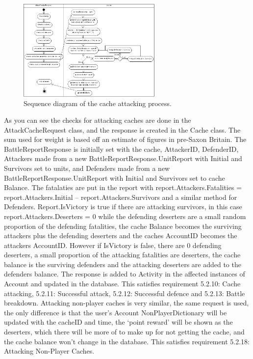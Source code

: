 \begin{figure}
    \centering
    \includegraphics[width=0.63\textwidth]{images/activity/server_attackCache}
    \caption{Sequence diagram of the cache attacking process.}
\end{figure}

As you can see the checks for attacking caches are done in the AttackCacheRequest class, and the response is created in the Cache class. The sum used for weight is based off an estimate of figures in pre-Saxon Britain. The BattleReportResponse is initially set with the cache, AttackerID, DefenderID, Attackers made from a new BattleReportResponse.UnitReport with Initial and Survivors set to units, and Defenders made from a new BattleReportResponse.UnitReport with Initial and Survivors set to cache Balance. The fatalaties are put in the report with report.Attackers.Fatalities = report.Attackers.Initial – report.Attackers.Survivors and a similar method for Defenders. Report.IsVictory is true if there are attacking survivors, in this case report.Attackers.Deserters = 0 while the defending deserters are a small random proportion of the defending fatalities, the cache Balance becomes the surviving attackers plus the defending deserters and the caches AccountID becomes the attackers AccountID. However if IsVictory is false, there are 0 defending deserters, a small proportion of the attacking fatalities are deserters, the cache balance is the surviving defenders and the attacking deserters are added to the defenders balance. The response is added to Activity in the affected instances of Account and updated in the database. This satisfies requirement 5.2.10: Cache attacking, 5.2.11: Successful attack, 5.2.12: Successful defence and 5.2.13: Battle breakdown. Attacking non-player caches is very similar, the same request is used, the only difference is that the user's Account NonPlayerDictionary will be updated with the cacheID and time, the `point reward' will be shown as the deserters, which there will be more of to make up for not getting the cache, and the cache balance won't change in the database. This satisfies requirement 5.2.18: Attacking Non-Player Caches.

